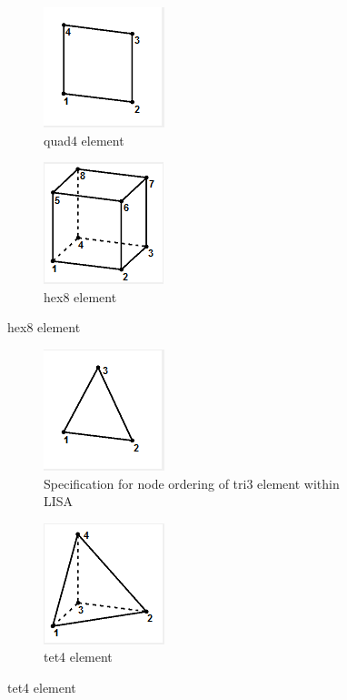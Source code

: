 \begin{figure}[!h]
\centering
\begin{subfigure}{.5\textwidth}
  \centering
  \includegraphics[width=0.3\linewidth]{../Graphics/LISA-quad4.png}
  \caption{quad4 element}
  \label{fig:sub1}
\end{subfigure}%
\begin{subfigure}{.5\textwidth}
  \centering
  \includegraphics[width=0.3\linewidth]{../Graphics/LISA-hex8.png}
  \caption{hex8 element}
  \label{fig:sub2}
\end{subfigure}
\label{fig:test}
\end{figure}


\begin{figure}[!h]
\centering
\begin{subfigure}{.5\textwidth}
  \centering
  \includegraphics[width=0.3\linewidth]{../Graphics/LISA-tri3.png}
  \caption{Specification for node ordering of tri3 element within LISA}
  \label{fig:sub1}
\end{subfigure}%
\begin{subfigure}{.5\textwidth}
  \centering
  \includegraphics[width=0.3\linewidth]{../Graphics/LISA-tet4.png}
  \caption{tet4 element}
  \label{fig:sub2}
\end{subfigure}
\label{fig:test}
\end{figure}


